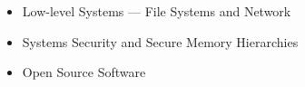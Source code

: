 
{\fontsize{9pt}{1em}\bodyfont\upshape\color{text}
\begin{itemize}[leftmargin=12pt]
    \setlength\itemsep{-3pt}
    \item Low-level Systems --- File Systems and Network
    \item Systems Security and Secure Memory Hierarchies
    \item Open Source Software
\end{itemize}
}
